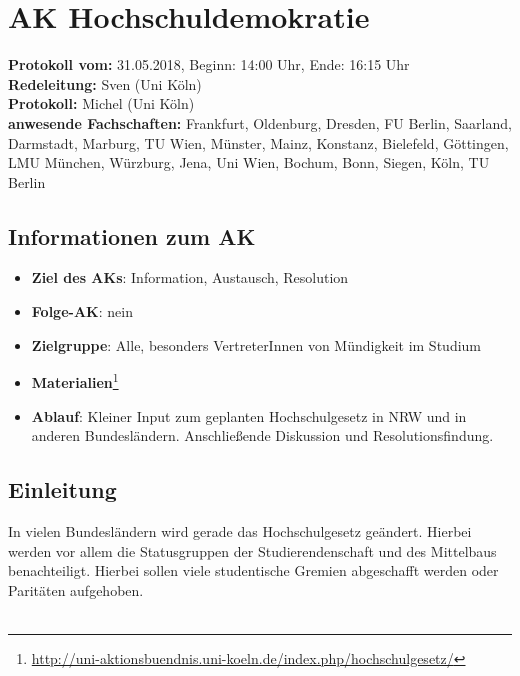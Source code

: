 
\section{AK Hochschuldemokratie}

  \textbf{Protokoll vom:} 31.05.2018, %
  Beginn: 14:00 Uhr, %
  Ende: 16:15 Uhr \\ %
  \textbf{Redeleitung:} Sven (Uni Köln) \\
  \textbf{Protokoll:} Michel (Uni Köln) \\
  \textbf{anwesende Fachschaften:} Frankfurt, Oldenburg, Dresden, FU Berlin, Saarland, Darmstadt, Marburg, TU Wien, Münster, Mainz, Konstanz, Bielefeld, Göttingen, LMU München, Würzburg, Jena, Uni Wien, Bochum, Bonn, Siegen, Köln, TU Berlin

  \subsection*{Informationen zum AK}
    \begin{itemize}
      \item \textbf{Ziel des AKs}: Information, Austausch, Resolution
      \item \textbf{Folge-AK}: nein
      \item \textbf{Zielgruppe}: Alle, besonders VertreterInnen von Mündigkeit im Studium
      \item \textbf{Materialien}\footnote{\url{http://uni-aktionsbuendnis.uni-koeln.de/index.php/hochschulgesetz/}}
      \item \textbf{Ablauf}: Kleiner Input zum geplanten Hochschulgesetz in NRW und in anderen Bundesländern. Anschließende Diskussion und Resolutionsfindung.
    \end{itemize}

  \subsection*{Einleitung}
    In vielen Bundesländern wird gerade das Hochschulgesetz geändert. Hierbei werden vor allem die Statusgruppen der Studierendenschaft und des Mittelbaus benachteiligt. Hierbei sollen viele studentische Gremien abgeschafft werden oder Paritäten aufgehoben. \\ \\

